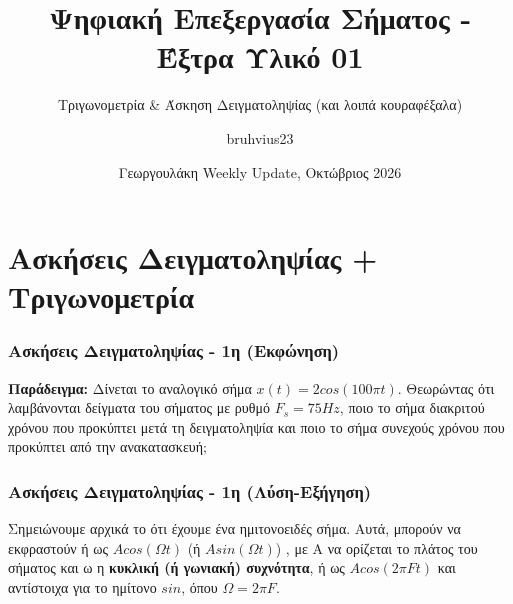 \documentclass{beamer}
\title[ΨΕΣ - Έξτρα Υλικό] %
{Ψηφιακή Επεξεργασία Σήματος - Έξτρα Υλικό 01}
\subtitle{Τριγωνομετρία \& Άσκηση Δειγματοληψίας (και λοιπά κουραφέξαλα)}
\author[\textlatin{bruhvius23}] %
{\textlatin{bruhvius23}\inst{1}}
\institute[ΠΑΔΑ] %
{
	\inst{1}%
	Τμήμα Μηχανικών Πληροφορικής και Υπολογιστών\\
	Πολυτεχνική Σχολή (χαχα καλό ε) \\
	Πανεπιστήμιο Δυτικής Αττικής
}
\date[Γ\textlatin{WU} 2026] %
{Γεωργουλάκη \textlatin{Weekly Update}, Οκτώβριος 2026}
\begin{document}
	\frame{\titlepage}
\section{Ασκήσεις Δειγματοληψίας + Τριγωνομετρία}	
	\begin{frame}
		\frametitle{Ασκήσεις Δειγματοληψίας - 1η (Εκφώνηση)}
		\textbf{Παράδειγμα:} Δίνεται το αναλογικό σήμα $x(t) = 2cos(100\pi t)$. Θεωρώντας ότι λαμβάνονται δείγματα του σήματος με ρυθμό $F_s=75Hz$, ποιο το σήμα διακριτού χρόνου που προκύπτει μετά τη δειγματοληψία και ποιο το σήμα συνεχούς χρόνου που προκύπτει από την ανακατασκευή$;$
	\end{frame}
	
	\begin{frame}
	\frametitle{Ασκήσεις Δειγματοληψίας - 1η (Λύση-Εξήγηση)}
	Σημειώνουμε αρχικά το ότι έχουμε ένα ημιτονοειδές σήμα. Αυτά, μπορούν να εκφραστούν ή ως $Acos(\Omega t)$ (ή $Asin(\Omega t)$) , με A να ορίζεται το πλάτος του σήματος και ω η \textbf{κυκλική (ή γωνιακή) συχνότητα}, ή ως $Acos(2\pi F t)$ και αντίστοιχα για το ημίτονο $sin$, όπου $\Omega = 2 \pi F$. 
	\end{frame}
	
\end{document}
